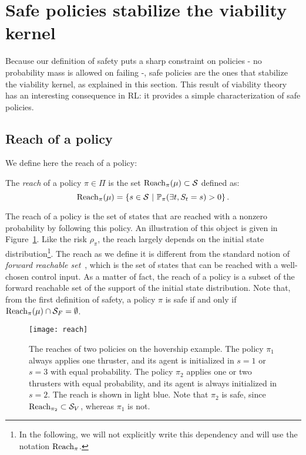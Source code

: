 \section{Safe policies stabilize the viability kernel} \label{sec:safe policies stabilize sv}
Because our definition of safety puts a sharp constraint on policies - no probability mass is allowed on failing -, safe policies are the ones that stabilize the viability kernel, as explained in this section. This result of viability theory has an interesting consequence in RL: it provides a simple characterization of safe policies.

\subsection{Reach of a policy}
We define here the reach of a policy:
\begin{definition}[Reach]
	The\emph{ reach} of a policy $\pi\in\Pi$ is the set $\operatorname{Reach}_\pi(\mu)\subset\mathcal{S}$ defined as:
	\begin{equation}
		\operatorname{Reach}_\pi(\mu) = \left\{s\in\mathcal{S}~\middle|~\mathbb{P}_\pi(\exists t, S_t = s) > 0\right\}. \label{eq:reach}
	\end{equation}
\end{definition}
The reach of a policy is the set of states that are reached with a nonzero probability by following this policy. An illustration of this object is given in Figure~\ref{fig:reach example}. Like the risk $\rho_\pi$, the reach largely depends on the initial state distribution\footnote{In the following, we will not explicitly write this dependency and will use the notation $\operatorname{Reach}_\pi$.}. The reach as we define it is different from the standard notion of\emph{ forward reachable set}~\cite{bansal2017hamilton}, which is the set of states that can be reached with a well-chosen control input. As a matter of fact, the reach of a policy is a subset of the forward reachable set of the support of the initial state distribution. Note that, from the first definition of safety, a policy $\pi$ is safe if and only if $\operatorname{Reach}_\pi(\mu) \cap{\ensuremath{\mathcal{S}}_{F}} = \emptyset$.
\begin{figure}
	\centering
	\texttt{[image: reach]}
	\caption{The reaches of two policies on the hovership example. The policy $\pi_1$ always applies one thruster, and its agent is initialized in $s=1$ or $s=3$ with equal probability. The policy $\pi_2$ applies one or two thrusters with equal probability, and its agent is always initialized in $s=2$. The reach is shown in light blue. Note that $\pi_2$ is safe, since $\operatorname{Reach}_{\pi_2} \subset{\ensuremath{\mathcal{S}}_{V}}$, whereas $\pi_1$ is not.}
	\label{fig:reach example}
\end{figure}
